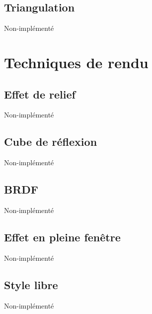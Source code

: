 \subsection{Triangulation}
Non-implémenté


\pagebreak
\section{Techniques de rendu}
\subsection{Effet de relief}
Non-implémenté

\subsection{Cube de réflexion}
Non-implémenté

\subsection{BRDF}
Non-implémenté

\subsection{Effet en pleine fenêtre}
Non-implémenté

\subsection{Style libre}
Non-implémenté

